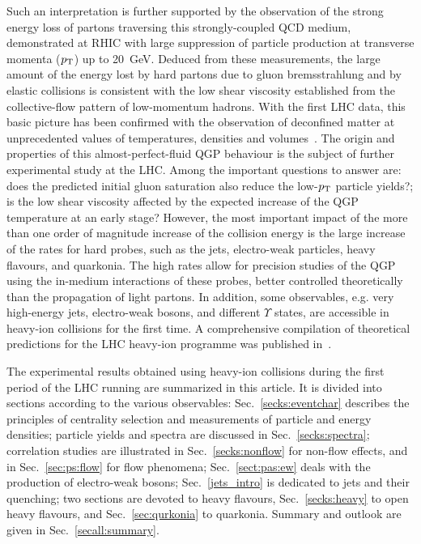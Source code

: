 Such an interpretation is further supported by the observation of the strong energy loss of partons traversing this strongly-coupled QCD medium, demonstrated at RHIC with large suppression of particle production at transverse momenta ($p_{\rm T}$) up to 20~GeV. Deduced from these measurements, the large amount of the energy lost by hard partons due to gluon bremsstrahlung and by elastic collisions is consistent with the low shear viscosity established from the collective-flow pattern of low-momentum hadrons. With the first LHC data, this basic picture has been confirmed with the observation of deconfined matter at unprecedented values of temperatures, densities and volumes~\cite{Muller:2012zq}. The origin and properties of this almost-perfect-fluid QGP behaviour  is the subject of further experimental study at the LHC. Among the important questions to answer are: does the predicted initial gluon saturation also reduce the low-$p_{\rm T}$ particle yields?; is the low shear viscosity affected by the expected increase of the QGP temperature at an early stage? However, the most important impact of the more than one order of magnitude increase of the collision energy is the large increase of the rates for hard probes, such as the jets, electro-weak particles, heavy flavours, and quarkonia. The high rates allow for precision studies of the QGP using the in-medium interactions of these probes, better controlled theoretically than the propagation of light partons. In addition, some observables, e.g. very high-energy jets, electro-weak bosons, and different $\Upsilon$ states, are accessible in heavy-ion collisions for the first time. A comprehensive compilation of theoretical predictions for the LHC heavy-ion programme was published in~\cite{Abreu:2007kv}.

The experimental results obtained using heavy-ion collisions during the first period of the LHC running are summarized in this article. It is divided into sections according to the various observables: Sec.~\ref{secks:eventchar} describes the principles of centrality selection and measurements of particle and energy densities; particle yields and spectra are discussed in Sec.~\ref{secks:spectra}; correlation studies are illustrated in Sec.~\ref{secks:nonflow} for non-flow effects, and in Sec.~\ref{sec:ps:flow} for flow phenomena; Sec.~\ref{sect:pas:ew} deals with the production of electro-weak bosons; Sec.~\ref{jets_intro} is dedicated to jets and their quenching; two sections are devoted to heavy flavours, Sec.~\ref{secks:heavy} to open heavy flavours, and Sec.~\ref{sec:qurkonia} to quarkonia. Summary and outlook are given in Sec.~\ref{secall:summary}.

